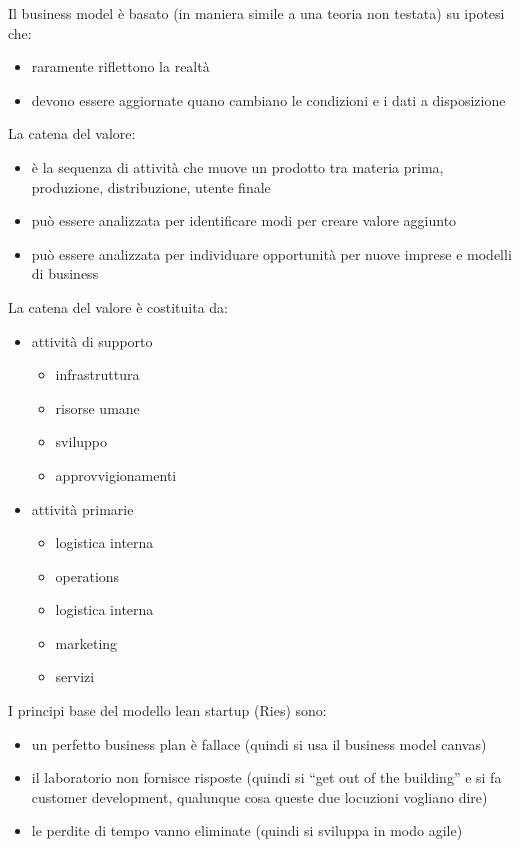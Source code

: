 \documentclass[answers, a4paper, 11pt]{exam}
\begin{document}
Il business model è basato (in maniera simile a una teoria non testata) su ipotesi che:

\begin{itemize}
    \item raramente riflettono la realtà
    \item devono essere aggiornate quano cambiano le condizioni e i dati a disposizione
\end{itemize}

La catena del valore:
\begin{itemize}
    \item è la sequenza di attività che muove un prodotto tra materia prima, produzione, distribuzione, utente finale
    \item può essere analizzata per identificare modi per creare valore aggiunto
    \item può essere analizzata per individuare opportunità per nuove imprese e modelli di business
\end{itemize}

La catena del valore è costituita da:
\begin{itemize}
    \item attività di supporto
    \begin{itemize}
        \item infrastruttura
        \item risorse umane
        \item sviluppo
        \item approvvigionamenti
    \end{itemize}
    \item attività primarie
    \begin{itemize}
        \item logistica interna
        \item operations
        \item logistica interna
        \item marketing
        \item servizi
    \end{itemize}
\end{itemize}

I principi base del modello lean startup (Ries) sono:
\begin{itemize}
    \item un perfetto business plan è fallace (quindi si usa il business model canvas)
    \item il laboratorio non fornisce risposte (quindi si ``get out of the building'' e si fa customer development, qualunque cosa queste due locuzioni vogliano dire)
    \item le perdite di tempo vanno eliminate (quindi si sviluppa in modo agile)
\end{itemize}
\end{document}
